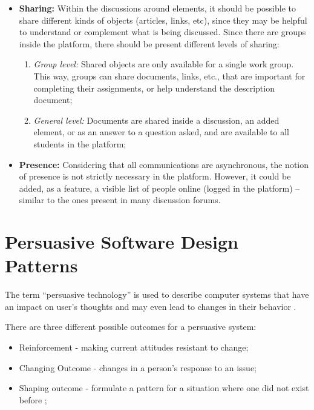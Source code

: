 \begin{itemize}
\item \textbf{Sharing:} Within the discussions around elements, it should be possible to share different kinds of objects (articles, links, etc), since they may be helpful to understand or complement what is being discussed. Since there are groups inside the platform, there should be present different levels of sharing:

\begin{enumerate}
\item \textit{Group level:} Shared objects are only available for a single work group. 
This way, groups can share documents, links, etc., that are important for completing their assignments, or help understand the description document;

\item \textit{General level:} Documents are shared inside a discussion, an added element, or as an answer to a question asked, and are available to all students in the platform;
\end{enumerate}


\item \textbf{Presence:} Considering that all communications are asynchronous, the notion of presence is not strictly necessary in the platform. 
However, it could be added, as a feature, a visible list of people online (logged in the platform) – similar to the ones present in many discussion forums.
\end{itemize}

\section{Persuasive Software Design Patterns}
The term ``persuasive technology'' is used to describe computer systems that have an impact on user's thoughts and may even lead to changes in their behavior \cite{fogg2002persuasive,oinas2009persuasive}.

There are three different possible outcomes for a persuasive system:

\begin{itemize}
\item Reinforcement - making current attitudes resistant to change;
\item Changing Outcome - changes in a person's response to an issue;
\item Shaping outcome - formulate a pattern for a situation where one did not exist before \cite{oinas2008towards};
\end{itemize}

